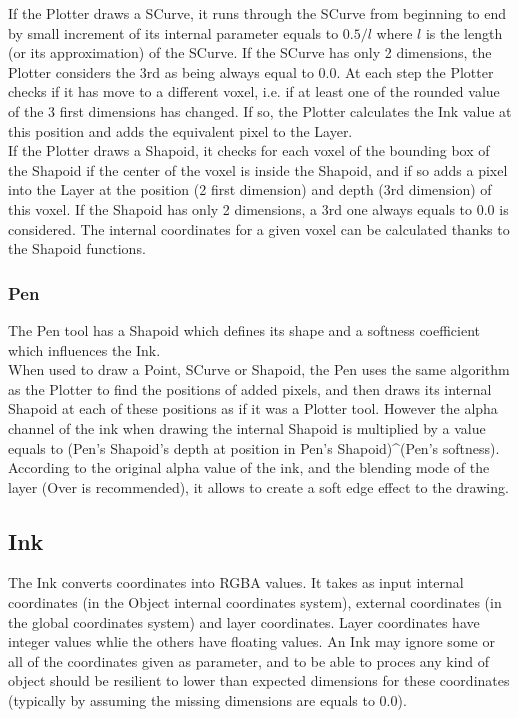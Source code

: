 If the Plotter draws a SCurve, it runs through the SCurve from beginning to end by small increment of its internal parameter equals to $0.5/l$ where $l$ is the length (or its approximation) of the SCurve. If the SCurve has only 2 dimensions, the Plotter considers the 3rd as being always equal to 0.0. At each step the Plotter checks if it has move to a different voxel, i.e. if at least one of the rounded value of the 3 first dimensions has changed. If so, the Plotter calculates the Ink value at this position and adds the equivalent pixel to the Layer.\\

If the Plotter draws a Shapoid, it checks for each voxel of the bounding box of the Shapoid if the center of the voxel is inside the Shapoid, and if so adds a pixel into the Layer at the position (2 first dimension) and depth (3rd dimension) of this voxel. If the Shapoid has only 2 dimensions, a 3rd one always equals to 0.0 is considered. The internal coordinates for a given voxel can be calculated thanks to the Shapoid functions.\\

\subsubsection{Pen}

The Pen tool has a Shapoid which defines its shape and a softness coefficient which influences the Ink.\\

When used to draw a Point, SCurve or Shapoid, the Pen uses the same algorithm as the Plotter to find the positions of added pixels, and then draws its internal Shapoid at each of these positions as if it was a Plotter tool. However the alpha channel of the ink when drawing the internal Shapoid is multiplied by a value equals to (Pen's Shapoid's depth at position in Pen's Shapoid)\^{}(Pen's softness). According to the original alpha value of the ink, and the blending mode of the layer (Over is recommended), it allows to create a soft edge effect to the drawing.\\

\subsection{Ink}

The Ink converts coordinates into RGBA values. It takes as input internal coordinates (in the Object internal coordinates system), external coordinates (in the global coordinates system) and layer coordinates. Layer coordinates have integer values whlie the others have floating values. An Ink may ignore some or all of the coordinates given as parameter, and to be able to proces any kind of object should be resilient to lower than expected dimensions for these coordinates (typically by assuming the missing dimensions are equals to 0.0).\\

